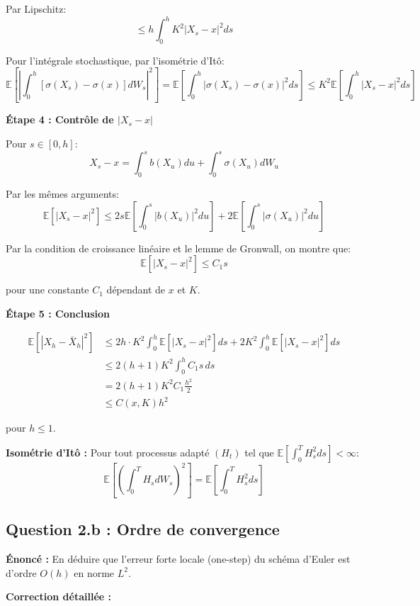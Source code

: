 \documentclass[12pt,a4paper]{article}
\theoremstyle{definition}
\newcommand{\E}{\mathbb{E}}
\begin{document}
Par Lipschitz:
\[
\leq h \int_0^h K^2 |X_s - x|^2 ds
\]

Pour l'intégrale stochastique, par l'isométrie d'Itô:
\[
\E\left[ \left| \int_0^h [\sigma(X_s) - \sigma(x)] dW_s \right|^2 \right] = \E\left[ \int_0^h |\sigma(X_s) - \sigma(x)|^2 ds \right] \leq K^2 \E\left[ \int_0^h |X_s - x|^2 ds \right]
\]

\textbf{Étape 4 : Contrôle de $|X_s - x|$}

Pour $s \in [0, h]$:
\[
X_s - x = \int_0^s b(X_u) du + \int_0^s \sigma(X_u) dW_u
\]

Par les mêmes arguments:
\[
\E[|X_s - x|^2] \leq 2s \E\left[\int_0^s |b(X_u)|^2 du\right] + 2\E\left[\int_0^s |\sigma(X_u)|^2 du\right]
\]

Par la condition de croissance linéaire et le lemme de Gronwall, on montre que:
\[
\E[|X_s - x|^2] \leq C_1 s
\]

pour une constante $C_1$ dépendant de $x$ et $K$.

\textbf{Étape 5 : Conclusion}

\begin{align*}
\E[|X_h - \bar{X}_h|^2] &\leq 2h \cdot K^2 \int_0^h \E[|X_s - x|^2] ds + 2K^2 \int_0^h \E[|X_s - x|^2] ds \\
&\leq 2(h+1) K^2 \int_0^h C_1 s \, ds \\
&= 2(h+1) K^2 C_1 \frac{h^2}{2} \\
&\leq C(x, K) h^2
\end{align*}

pour $h \leq 1$.

\begin{rappel}
\textbf{Isométrie d'Itô :} Pour tout processus adapté $(H_t)$ tel que $\E[\int_0^T H_s^2 ds] < \infty$:
\[
\E\left[ \left( \int_0^T H_s dW_s \right)^2 \right] = \E\left[ \int_0^T H_s^2 ds \right]
\]
\end{rappel}

\subsection{Question 2.b : Ordre de convergence}

\textbf{Énoncé :} En déduire que l'erreur forte locale (one-step) du schéma d'Euler est d'ordre $O(h)$ en norme $L^2$.

\textbf{Correction détaillée :}
\end{document}
